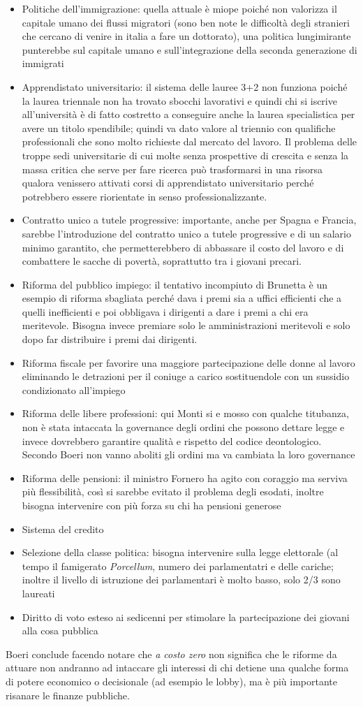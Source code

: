 \documentclass[11pt]{article}
\begin{document}
\begin{itemize}
\item Politiche dell'immigrazione: quella attuale è miope poiché non valorizza il capitale umano
dei flussi migratori (sono ben note le difficoltà degli stranieri che cercano di venire in italia a fare un dottorato), 
una politica lungimirante punterebbe sul capitale umano e sull'integrazione della seconda generazione di immigrati
\item Apprendistato universitario: il sistema delle lauree 3+2 non
funziona poiché la laurea triennale non ha trovato sbocchi lavorativi e quindi chi si iscrive all'università
è di fatto costretto a conseguire anche la laurea specialistica per avere un titolo spendibile;
quindi va dato valore al triennio con qualifiche professionali che sono molto richieste dal mercato del lavoro.
Il problema delle troppe sedi universitarie di cui molte senza prospettive di crescita e senza la massa critica che serve
per fare ricerca può trasformarsi in una risorsa qualora venissero attivati corsi di apprendistato 
universitario perché potrebbero essere riorientate in senso professionalizzante.
\item Contratto unico a tutele progressive: importante, anche per Spagna e Francia,
sarebbe l'introduzione del contratto unico a tutele progressive e di un salario minimo garantito, che permetterebbero di
abbassare il costo del lavoro e di combattere le sacche di povertà, soprattutto tra i giovani precari.
\item Riforma del pubblico impiego: il tentativo incompiuto di Brunetta è un esempio di riforma sbagliata
perché dava i premi sia a uffici efficienti che a quelli inefficienti e poi obbligava i dirigenti a dare i premi a chi era meritevole. 
Bisogna invece premiare solo le amministrazioni meritevoli e solo dopo far distribuire i premi dai dirigenti.
\item Riforma fiscale per favorire una maggiore partecipazione delle donne al lavoro eliminando le detrazioni per il coniuge a carico
sostituendole con un sussidio condizionato all'impiego
\item Riforma delle libere professioni: qui Monti si e mosso con qualche titubanza, non è stata intaccata la governance
degli ordini che possono dettare legge e invece dovrebbero garantire qualità e rispetto del codice deontologico. Secondo Boeri 
non vanno aboliti gli ordini ma va cambiata la loro governance
\item Riforma delle pensioni: il ministro Fornero ha agito con coraggio ma serviva più flessibilità, così si sarebbe 
evitato il problema degli esodati, inoltre bisogna intervenire con più forza su chi ha pensioni generose
\item Sistema del credito
\item Selezione della classe politica: bisogna intervenire sulla legge elettorale (al tempo il famigerato \textit{Porcellum}, numero
dei parlamentatri e delle cariche; inoltre il livello di istruzione dei parlamentari è molto basso, solo 2/3 sono laureati
\item Diritto di voto esteso ai sedicenni per stimolare la partecipazione dei giovani alla cosa pubblica
\end{itemize}
Boeri conclude facendo notare che \emph{a costo zero} non significa che le riforme da attuare non andranno
ad intaccare gli interessi di chi detiene una qualche forma di potere economico o decisionale (ad esempio le 
lobby), ma è più importante risanare le finanze pubbliche.
\end{document}
